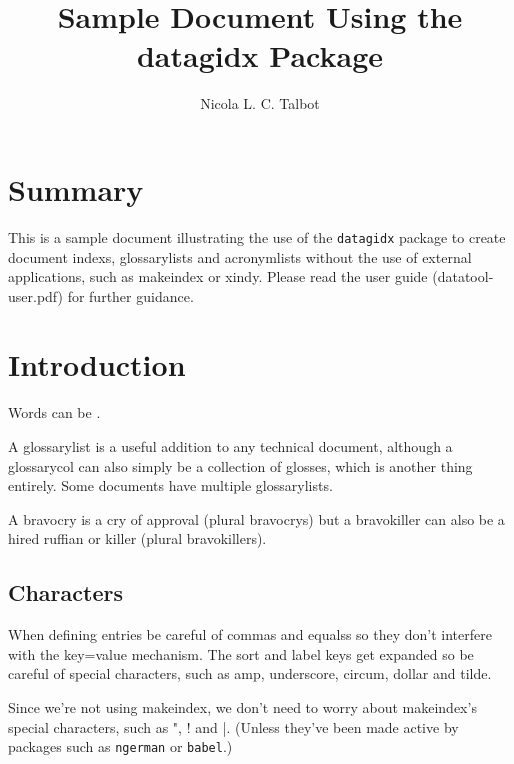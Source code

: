 \documentclass{book}
\title{Sample Document Using the datagidx Package}
\author{Nicola L. C. Talbot}
\newcommand*{\glsed}[1]{\useentry{#1}{Ed}}
\newcommand*{\glsing}[1]{\useentry{#1}{Ing}}
\begin{document}
\maketitle
\thispagestyle{empty}%

\frontmatter

\tableofcontents

\chapter{Summary}

This is a sample document illustrating the use of the
\texttt{datagidx} package to create document \glspl{index},
\glspl{glossarylist} and \glspl{acronymlist} without the use of
external \glsing{index} %
applications, such as \gls{makeindex} or
\gls{xindy}. Please read the user guide (datatool-user.pdf) for
further guidance.

\mainmatter

\chapter{Introduction}

Words can be \glsed{index}. %

A \gls{glossarylist} is a useful addition to any technical document,
although a \gls{glossarycol} can also simply be a collection of
glosses, which is another thing entirely. Some documents have
multiple \glspl{glossarylist}.

A \gls{bravocry} is a cry of approval (plural \glspl{bravocry}) but a 
\gls{bravokiller} can also be a hired ruffian or killer (plural
\glspl{bravokiller}).

\section{Characters}

When defining entries be careful of \glspl{comma} and \glspl{equals}
so they don't interfere with the key=value mechanism. The sort and
label keys get expanded so be careful of special characters, such as
\gls{amp}, \gls{underscore}, \gls{circum}, \gls{dollar} and \gls{tilde}.

Since we're not using \gls{makeindex}, we don't need to worry about
\gls{makeindex}'s special characters, such as \gls{"}, \gls{!} and
\gls{|}. (Unless they've been made active by packages such as
\texttt{ngerman} or \texttt{babel}.)
\end{document}
